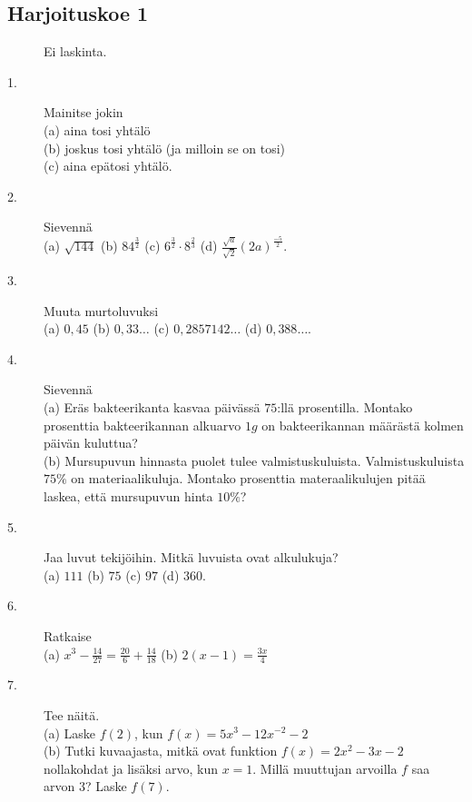 \subsection*{Harjoituskoe 1}


\begin{description}
	\item[] Ei laskinta.
	\item[1.] Mainitse jokin \\
	(a) aina tosi yhtälö \\
	(b) joskus tosi yhtälö (ja milloin se on tosi) \\
	(c) aina epätosi yhtälö.
	\item[2.] Sievennä \\
	(a) $\sqrt{144}$ \qquad
	(b) $84^\frac{3}{2}$ \qquad
	(c) $ 6^\frac{3}{2}\cdot 8^\frac{2}{3} $ \qquad
	(d) $\frac{\sqrt{a}}{\sqrt{2}}(2a)^{\frac{-5}{2}}$.
	\item[3.] Muuta murtoluvuksi \\
	(a) $0,45$ \qquad
	(b) $0,33\ldots$ \qquad
	(c) $0,2857142\ldots$ \qquad
	(d) $0,388\ldots$.
	\item[4.] Sievennä \\
	(a) Eräs bakteerikanta kasvaa päivässä $75$:llä prosentilla. Montako prosenttia bakteerikannan alkuarvo $1 g$ on bakteerikannan määrästä kolmen päivän kuluttua? \\
	(b) Mursupuvun hinnasta puolet tulee valmistuskuluista. Valmistuskuluista $75\%$ on materiaalikuluja. Montako prosenttia materaalikulujen pitää laskea, että mursupuvun hinta $10\%$? \qquad
	\item[5.] Jaa luvut tekijöihin. Mitkä luvuista ovat alkulukuja? \\
	(a) $111$ \qquad
	(b) $75$ \qquad
	(c) $97$ \qquad
	(d) $360$.
	\item[6.] Ratkaise \\
	(a) $x^3 - \frac{14}{27} = \frac{20}{6}+\frac{14}{18}$ \qquad
	(b) $2(x-1)=\frac{3x}{4}$
	\item[7.] Tee näitä.  \\
	(a) Laske $f(2)$, kun $f(x)=5x^{3}-12x^{-2}-2$ \\
	(b) Tutki kuvaajasta, mitkä ovat funktion $f(x)=2x^2-3x-2$ nollakohdat ja lisäksi arvo, kun $x=1$. Millä muuttujan arvoilla $f$ saa arvon $3$? Laske $f(7)$.
	
	\begin{center}
		\begin{kuvaajapohja}{1.0}{-3}{5}{-4}{4}
		\end{kuvaajapohja}
	\end{center}


\end{description}
